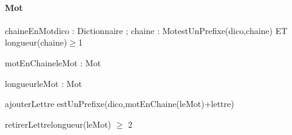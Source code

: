\paragraph{Mot}
\begin{algorithme}
  \signatureFonctionAvecPreconditions
  {chaineEnMot}{dico : Dictionnaire ; chaine : \chaine}{Mot}{estUnPrefixe(dico,chaine) ET longueur(chaine)$\geq$1}

  \signaturefonction
  {motEnChaine}{leMot : Mot}{\chaine}

  \signaturefonction
  {longueur}{leMot : Mot}{\naturelNonNul}

  \signatureProcedureAvecPreconditions
  {ajouterLettre}{ }{estUnPrefixe(dico,motEnChaine(leMot)+lettre)}

  \signatureProcedureAvecPreconditions
  {retirerLettre}{}{longueur(leMot) $\geq$ 2}

\end{algorithme}
